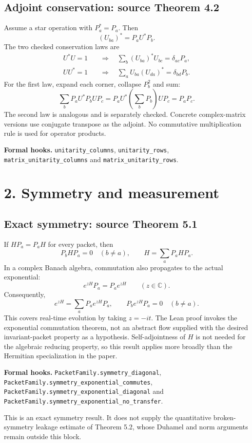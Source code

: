 \documentclass[11pt]{article}
\newcommand{\C}{\mathbb C}
\newcommand{\code}[1]{{\small\nolinkurl{#1}}}
\begin{document}
\subsection*{Adjoint conservation: source Theorem 4.2}
Assume a star operation with $P_a^*=P_a$. Then
\[
(U_{ba})^*=P_aU^*P_b.
\]
The two checked conservation laws are
\begin{align*}
U^*U=1&\quad\Longrightarrow\quad
\sum_b(U_{ba})^*U_{bc}=\delta_{ac}P_a,\\
UU^*=1&\quad\Longrightarrow\quad
\sum_aU_{ba}(U_{da})^*=\delta_{bd}P_b.
\end{align*}
For the first law, expand each corner, collapse $P_b^2$ and sum:
\[
\sum_bP_aU^*P_bUP_c
=P_aU^*\left(\sum_bP_b\right)UP_c=P_aP_c.
\]
The second law is analogous and is separately checked. Concrete complex-matrix versions use conjugate transpose as the adjoint. No commutative multiplication rule is used for operator products.

\textbf{Formal hooks.} \code{unitarity_columns}, \code{unitarity_rows},
\code{matrix_unitarity_columns} and \code{matrix_unitarity_rows}.

\clearpage
\section*{2. Symmetry and measurement}
\subsection*{Exact symmetry: source Theorem 5.1}
If $HP_a=P_aH$ for every packet, then
\[
P_bHP_a=0\quad(b\ne a),\qquad H=\sum_aP_aHP_a.
\]
In a complex Banach algebra, commutation also propagates to the actual exponential:
\[
e^{zH}P_a=P_ae^{zH}\qquad(z\in\C).
\]
Consequently,
\[
e^{zH}=\sum_aP_ae^{zH}P_a,
\qquad P_be^{zH}P_a=0\quad(b\ne a).
\]
This covers real-time evolution by taking $z=-it$. The Lean proof invokes the exponential commutation theorem, not an abstract flow supplied with the desired invariant-packet property as a hypothesis. Self-adjointness of $H$ is not needed for the algebraic reducing property, so this result applies more broadly than the Hermitian specialization in the paper.

\textbf{Formal hooks.} \code{PacketFamily.symmetry_diagonal},
\code{PacketFamily.symmetry_exponential_commutes},
\code{PacketFamily.symmetry_exponential_diagonal} and
\code{PacketFamily.symmetry_exponential_no_transfer}.

This is an exact symmetry result. It does not supply the quantitative broken-symmetry leakage estimate of Theorem 5.2, whose Duhamel and norm arguments remain outside this block.
\end{document}
